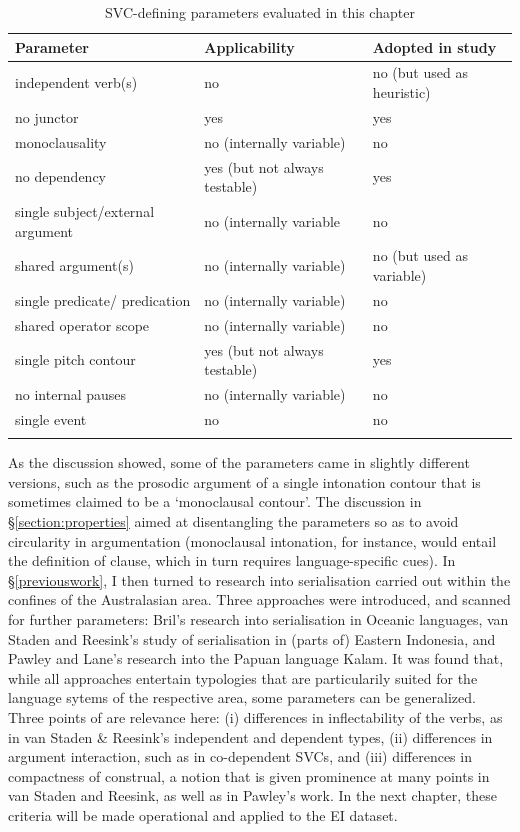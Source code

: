 \begin{table}
    \centering
    \begin{footnotesize}
    \begin{tabular}{l l l}
    \lsptoprule
Parameter & Applicability & Adopted in study \\
\hline
independent verb(s) & no & no (but used as heuristic) \\
no junctor & yes & yes \\
monoclausality & no (internally variable) & no \\
no dependency & yes (but not always testable) & yes \\
single subject/external argument & no (internally variable & no \\
shared argument(s) & no (internally variable) & no (but used as variable) \\
single predicate/ predication & no (internally variable) & no \\
shared operator scope & no (internally variable) & no \\
single pitch contour & yes (but not always testable) & yes \\
no internal pauses & no (internally variable) & no \\
single event & no & no \\
\lspbottomrule
    \end{tabular}
    \end{footnotesize}
    \caption{SVC-defining parameters evaluated in this chapter}
    \label{tab:parameters_used}
\end{table}

As the discussion showed, some of the parameters came in slightly different versions, such as the prosodic argument of a single intonation contour that is sometimes claimed to be a `monoclausal contour'. The discussion in §\ref{section:properties} aimed at disentangling the parameters so as to avoid circularity in argumentation (monoclausal intonation, for instance, would entail the definition of clause, which in turn requires language-specific cues). In §\ref{previouswork}, I then turned to research into serialisation carried out within the confines of the Australasian area. Three approaches were introduced, and scanned for further parameters: Bril's research into serialisation in Oceanic languages, van Staden and Reesink's study of serialisation in (parts of) Eastern Indonesia, and Pawley and Lane's research into the Papuan language Kalam. It was found that, while all approaches entertain typologies that are particularily suited for the language sytems of the respective area, some parameters can be generalized. Three points of are relevance here: (i) differences in inflectability of the verbs, as in van Staden \& Reesink's independent and dependent types, (ii) differences in argument interaction, such as in co-dependent SVCs, and (iii) differences in compactness of construal, a notion that is given prominence at many points in van Staden and Reesink, as well as in Pawley's work. In the next chapter, these criteria will be made operational and applied to the EI dataset.

